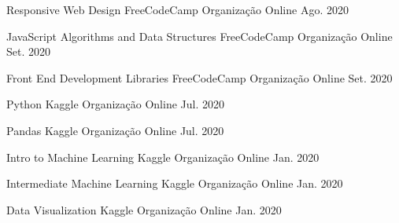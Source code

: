

\begin{cvhonors}

  \cvhonor
    {Responsive Web Design} %
    {FreeCodeCamp} %
    {Organização Online} %
    {Ago. 2020} %

  \cvhonor
    {JavaScript Algorithms and Data Structures} %
    {FreeCodeCamp} %
    {Organização Online} %
    {Set. 2020} %

  \cvhonor
    {Front End Development Libraries} %
    {FreeCodeCamp} %
    {Organização Online} %
    {Set. 2020} %

  \cvhonor
    {Python} %
    {Kaggle} %
    {Organização Online} %
    {Jul. 2020} %

  \cvhonor
    {Pandas} %
    {Kaggle} %
    {Organização Online} %
    {Jul. 2020} %

  \cvhonor
    {Intro to Machine Learning} %
    {Kaggle} %
    {Organização Online} %
    {Jan. 2020} %

  \cvhonor
    {Intermediate Machine Learning} %
    {Kaggle} %
    {Organização Online} %
    {Jan. 2020} %

  \cvhonor
    {Data Visualization} %
    {Kaggle} %
    {Organização Online} %
    {Jan. 2020} %

\end{cvhonors}
